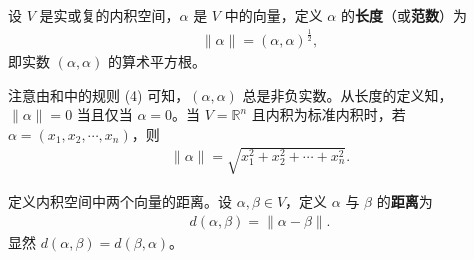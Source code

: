 \documentclass[../../main.tex]{subfiles}
\begin{document}
\begin{definition}[范数]\label{definition:向量的长度或范数}
设 \(V\) 是实或复的内积空间，\(\alpha\) 是 \(V\) 中的向量，定义 \(\alpha\) 的\textbf{长度}（或\textbf{范数}）为
\begin{align*}
\|\alpha\|=(\alpha,\alpha)^{\frac{1}{2}},
\end{align*}
即实数 \((\alpha,\alpha)\) 的算术平方根。
\end{definition}
\begin{remark}
注意由和中的规则 (4) 可知，\((\alpha,\alpha)\) 总是非负实数。从长度的定义知，\(\|\alpha\| = 0\) 当且仅当 \(\alpha = 0\)。当 \(V=\mathbb{R}^n\) 且内积为标准内积时，若 \(\alpha=(x_1,x_2,\cdots,x_n)\)，则
\begin{align*}
\|\alpha\|=\sqrt{x_1^2 + x_2^2+\cdots + x_n^2}.
\end{align*}
\end{remark}

\begin{definition}[两个向量的距离]\label{definition:两个向量的距离}
定义内积空间中两个向量的距离。设 \(\alpha,\beta\in V\)，定义 \(\alpha\) 与 \(\beta\) 的\textbf{距离}为
\begin{align*}
d(\alpha,\beta)=\|\alpha - \beta\|.
\end{align*}
显然 \(d(\alpha,\beta)=d(\beta,\alpha)\)。
\end{definition}
\end{document}
